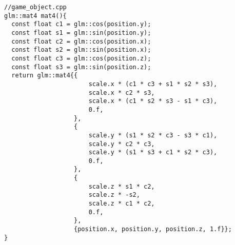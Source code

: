\documentclass[12pt]{report} \usepackage{preamble}
\begin{document}
\begin{lstlisting}
//game_object.cpp
glm::mat4 mat4(){
  const float c1 = glm::cos(position.y);
  const float s1 = glm::sin(position.y);
  const float c2 = glm::cos(position.x);
  const float s2 = glm::sin(position.x);
  const float c3 = glm::cos(position.z);
  const float s3 = glm::sin(position.z);
  return glm::mat4{{
                       scale.x * (c1 * c3 + s1 * s2 * s3),
                       scale.x * c2 * s3,
                       scale.x * (c1 * s2 * s3 - s1 * c3),
                       0.f,
                   },
                   {
                       scale.y * (s1 * s2 * c3 - s3 * c1),
                       scale.y * c2 * c3,
                       scale.y * (s1 * s3 + c1 * s2 * c3),
                       0.f,
                   },
                   {
                       scale.z * s1 * c2,
                       scale.z * -s2,
                       scale.z * c1 * c2,
                       0.f,
                   },
                   {position.x, position.y, position.z, 1.f}};
}
\end{lstlisting}

\printbibliography[
	heading=bibintoc, title={Bibliography}
]
\end{document}
